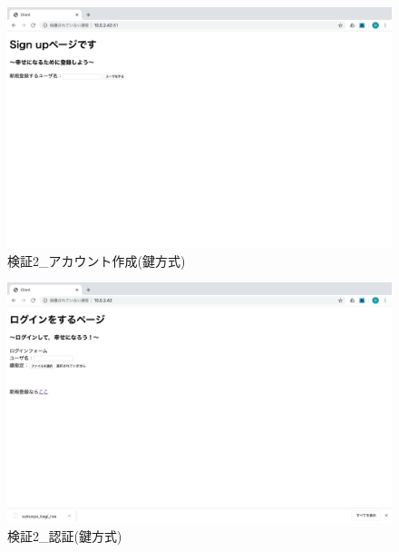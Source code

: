     \vspace{4cm}%
    \begin{figure}[H]
        \includegraphics[width=15cm]{./fig/chapter4/inspect_2/key_screnn/sign_up.png}
        \caption{検証2\_アカウント作成(鍵方式)}
        \label{検証２アカウント作成(鍵方式)}
    \end{figure}

    \vspace{4cm}%
    \begin{figure}[H]
        \includegraphics[width=15cm]{./fig/chapter4/inspect_2/key_screnn/login.png}
        \caption{検証2\_認証(鍵方式)}
        \label{検証２認証(鍵方式)}
    \end{figure}

